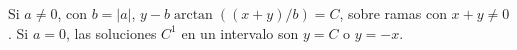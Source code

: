 Si $a\ne0$, con $b=|a|$, $y-b\arctan((x+y)/b)=C$, sobre ramas con $x+y\ne0$. Si $a=0$, las soluciones $C^1$ en un intervalo son $y=C$ o $y=-x$.

